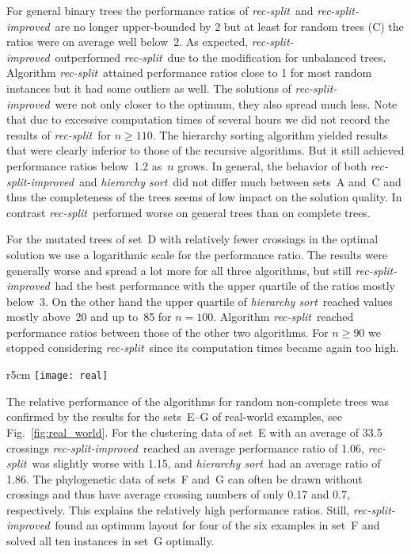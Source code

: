 \documentclass[runningheads,a4paper]{llncs}
\newcommand{\recsplit}{\emph{rec-split}}
\newcommand{\recimproved}{\emph{rec-split-improved}}
\newcommand{\hiersort}{\emph{hierarchy sort}}
\begin{document}
For general binary trees the performance ratios of \recsplit\ and
\recimproved\ are no longer upper-bounded by 2 but at least for random
trees (C) the ratios were on average well below~2. As expected,
\recimproved\ outperformed \recsplit\ due to the modification for
unbalanced trees. Algorithm \recsplit\ attained performance ratios
close to 1 for most random instances but it had some outliers as
well. The solutions of \recimproved\ were not only closer to the
optimum, they also spread much less. Note that due to excessive
computation times of several hours we did not record the results of
\recsplit\ for $n \ge 110$. The hierarchy sorting algorithm yielded
results that were clearly inferior to those of the recursive
algorithms. But it still achieved performance ratios below~1.2 as~$n$
grows. In general, the behavior of both \recimproved\ and \hiersort\
did not differ much between sets~A and~C and thus the completeness of
the trees seems of low impact on the solution quality. In contrast
\recsplit\ performed worse on general trees than on complete trees.

For the mutated trees of set~D with relatively fewer crossings in the
optimal solution we use a logarithmic scale for the performance
ratio. The results were generally worse and spread a lot more for all
three algorithms, but still \recimproved\ had the best performance
with the upper quartile of the ratios mostly below~3. 
On the other
hand the upper quartile of \hiersort\ reached 
values mostly above~20 and up
to~85 for $n=100$. Algorithm \recsplit\ reached performance ratios
between those of the other two algorithms. For $n \ge 90$ we stopped
considering \recsplit\ since its computation times became again too
high.

\begin{wrapfigure}[12]{r}{5cm}
  \centering
  \vspace*{-5ex}
  \texttt{[image: real]}
  \vspace*{-1ex}
  \caption{Performance ratios for real-world examples.}
  \label{fig:real_world}
\end{wrapfigure}
The relative performance of the algorithms for random
non-complete trees was confirmed by the results for the sets~E--G of
real-world examples, see Fig.~\ref{fig:real_world}.
For the clustering data of set~E with an average
of 33.5 crossings \recimproved\ reached an average performance ratio
of 1.06, \recsplit\ was slightly
worse with 1.15, and \hiersort\ had an
average ratio of 1.86. The phylogenetic data of sets~F and~G can often
be drawn without crossings and thus have average crossing numbers of
only 0.17 and 0.7, respectively. This explains the relatively high
performance ratios. Still, \recimproved\ found an optimum layout for
four of the six examples in set~F and solved all ten instances in set~G
optimally.
\end{document}
